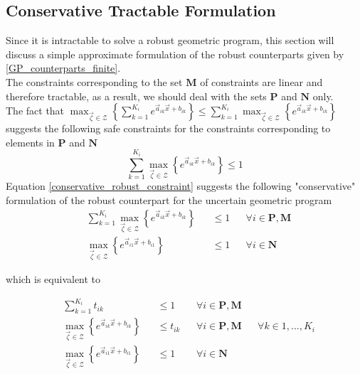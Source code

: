 \subsection{Conservative Tractable Formulation} \label{Conservative}
Since it is intractable to solve a robust geometric program, this section will discuss a simple approximate formulation of the robust counterparts given by \eqref{GP_counterparts_finite}.\\[12pt]
The constraints corresponding to the set $\mathbf{M}$ of constraints are linear and therefore tractable, as a result, we should deal with the sets $\mathbf{P}$ and $\mathbf{N}$ only.\\[12pt]
The fact that $\max_{\vec{\zeta} \in \mathcal{Z}} \left\{\textstyle{\sum}_{k=1}^{K_i}e^{\vec{a}_{ik}\vec{x} + b_{ik}}\right\} \leq \sum_{k=1}^{K_i}\max_{\vec{\zeta} \in \mathcal{Z}} \left\{e^{\vec{a}_{ik}\vec{x} + b_{ik}}\right\}$ suggests the following safe constraints for the constraints corresponding to elements in $\mathbf{P}$ and $\mathbf{N}$
\begin{equation}
\sum_{k=1}^{K_i}\max_{\vec{\zeta} \in \mathcal{Z}} \left\{e^{\vec{a}_{ik}\vec{x} + b_{ik}}\right\} \leq 1
\label{conservative_robust_constraint}
\end{equation}
Equation \eqref{conservative_robust_constraint} suggests the following "conservative" formulation of the robust counterpart for the uncertain geometric program
\begin{equation}
\begin{aligned}
&\textstyle{\sum}_{k=1}^{K_i}\max_{\vec{\zeta} \in \mathcal{Z}} \left\{e^{\vec{a}_{ik}\vec{x} + b_{ik}}\right\} &&\leq 1 &&\forall i \in \mathbf{P},\mathbf{M}\\
&\max_{\vec{\zeta} \in \mathcal{Z}} \left\{e^{\vec{a}_{i1}\vec{x} + b_{i1}}\right\} &&\leq 1 &&\forall i \in \mathbf{N}
\end{aligned}
\label{GP_safe_conservative}
\end{equation}

which is equivalent to

\begin{equation}
\begin{aligned}
&\textstyle{\sum}_{k=1}^{K_i}t_{ik} &&\leq 1 &&\forall i \in \mathbf{P},\mathbf{M} \\
&\max_{\vec{\zeta} \in \mathcal{Z}} \left\{e^{\vec{a}_{ik}\vec{x} + b_{ik}}\right\} &&\leq t_{ik} &&\forall i \in \mathbf{P},\mathbf{M} &&\forall k \in 1,...,K_i\\
&\max_{\vec{\zeta} \in \mathcal{Z}} \left\{e^{\vec{a}_{i1}\vec{x} + b_{i1}}\right\} &&\leq 1 &&\forall i \in \mathbf{N}
\end{aligned}
\label{GP_safe_decoupled}
\end{equation}

